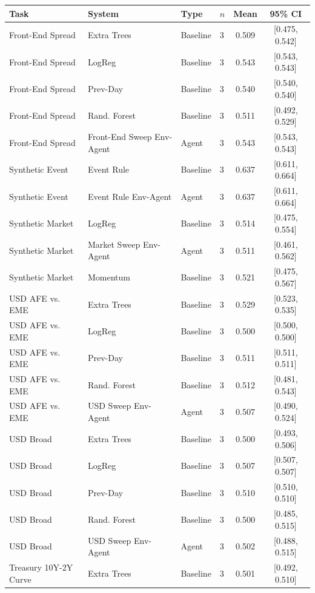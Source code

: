 \begin{table}[t]
\centering
\small
\begin{tabular}{llllcc}
\toprule
Task & System & Type & $n$ & Mean & 95\% CI \\
\midrule
Front-End Spread & Extra Trees & Baseline & 3 & 0.509 & [0.475, 0.542] \\
Front-End Spread & LogReg & Baseline & 3 & 0.543 & [0.543, 0.543] \\
Front-End Spread & Prev-Day & Baseline & 3 & 0.540 & [0.540, 0.540] \\
Front-End Spread & Rand. Forest & Baseline & 3 & 0.511 & [0.492, 0.529] \\
Front-End Spread & Front-End Sweep Env-Agent & Agent & 3 & 0.543 & [0.543, 0.543] \\
Synthetic Event & Event Rule & Baseline & 3 & 0.637 & [0.611, 0.664] \\
Synthetic Event & Event Rule Env-Agent & Agent & 3 & 0.637 & [0.611, 0.664] \\
Synthetic Market & LogReg & Baseline & 3 & 0.514 & [0.475, 0.554] \\
Synthetic Market & Market Sweep Env-Agent & Agent & 3 & 0.511 & [0.461, 0.562] \\
Synthetic Market & Momentum & Baseline & 3 & 0.521 & [0.475, 0.567] \\
USD AFE vs. EME & Extra Trees & Baseline & 3 & 0.529 & [0.523, 0.535] \\
USD AFE vs. EME & LogReg & Baseline & 3 & 0.500 & [0.500, 0.500] \\
USD AFE vs. EME & Prev-Day & Baseline & 3 & 0.511 & [0.511, 0.511] \\
USD AFE vs. EME & Rand. Forest & Baseline & 3 & 0.512 & [0.481, 0.543] \\
USD AFE vs. EME & USD Sweep Env-Agent & Agent & 3 & 0.507 & [0.490, 0.524] \\
USD Broad & Extra Trees & Baseline & 3 & 0.500 & [0.493, 0.506] \\
USD Broad & LogReg & Baseline & 3 & 0.507 & [0.507, 0.507] \\
USD Broad & Prev-Day & Baseline & 3 & 0.510 & [0.510, 0.510] \\
USD Broad & Rand. Forest & Baseline & 3 & 0.500 & [0.485, 0.515] \\
USD Broad & USD Sweep Env-Agent & Agent & 3 & 0.502 & [0.488, 0.515] \\
Treasury 10Y-2Y Curve & Extra Trees & Baseline & 3 & 0.501 & [0.492, 0.510] \\

\end{tabular}
\end{table}

